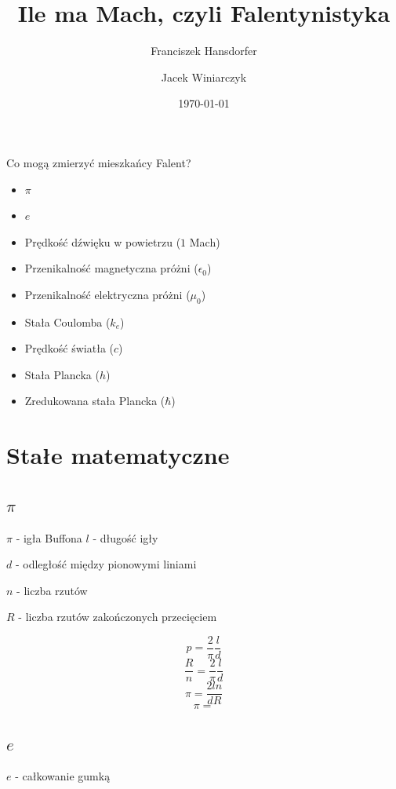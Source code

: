 \documentclass{beamer}
\title{Ile ma Mach, czyli Falentynistyka}
\author{Franciszek Hansdorfer \and Jacek Winiarczyk}
\institute{Wydział fizyki doświadczalnej KFnrD}
\date{\today}
\begin{document}
\begin{frame}
	\titlepage
\end{frame}

\begin{frame}{Co mogą zmierzyć mieszkańcy Falent?}
	\begin{itemize}
		\item $\pi$
		\item $e$
		\item Prędkość dźwięku w powietrzu ($1$ Mach)
		\item Przenikalność magnetyczna próżni ($\epsilon_0$)
		\item Przenikalność elektryczna próżni ($\mu_0$)
		\item Stała Coulomba ($k_e$)
		\item Prędkość światła ($c$)
		\item Stała Plancka ($h$)
		\item Zredukowana stała Plancka ($\hbar$)
	\end{itemize}

\end{frame}

\section{Stałe matematyczne}

\subsection{$\pi$}

\begin{frame}{$\pi$ - igła Buffona}
	$l$ - długość igły

	$d$ - odległość między pionowymi liniami

	$n$ - liczba rzutów

	$R$ - liczba rzutów zakończonych przecięciem

	$$p = \frac{2}{\pi} \frac{l}{d}$$
	$$\frac{R}{n} = \frac{2}{\pi}\frac{l}{d}$$
	$$\pi = \frac{2 l n}{d R}$$
	$$\pi =$$

\end{frame}

\subsection{$e$}

\begin{frame}{$e$ - całkowanie gumką}

\end{frame}
\end{document}
